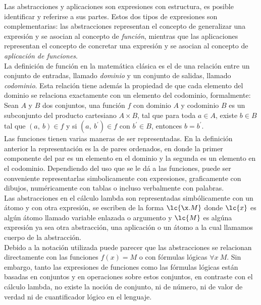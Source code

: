 Las abstracciones y aplicaciones son expresiones con estructura, es posible
identificar y referirse a sus partes. Estos dos tipos de expresiones son
complementarias: las abstracciones representan el concepto de generalizar una
expresión y se asocian al concepto de \emph{función}, mientras que las aplicaciones
representan el concepto de concretar una expresión y se asocian al concepto de
\emph{aplicación de funciones}. \\

La definición de función en la matemática clásica es el de una relación entre un
conjunto de entradas, llamado \emph{dominio} y un conjunto de salidas, llamado
\emph{codominio}. Esta relación tiene además la propiedad de que cada elemento
del dominio se relaciona exactamente con un elemento del codominio,
formalmente: \\

Sean \(A\) y \(B\) dos conjuntos, una función \(f\) con dominio \(A\) y
codominio \(B\) es un subconjunto del producto cartesiano \(A\times B\), tal que
para toda \(a\in A\), existe \(b\in B\) tal que \((a,\ b)\in f\) y si \((a,\
b^\prime)\in f\) con \(b^\prime \in B\), entonces \(b=b^\prime\). \\

Las funciones tienen varias maneras de ser representadas. En la definición
anterior la representación es la de pares ordenados, en donde la primer
componente del par es un elemento en el dominio y la segunda es un elemento en
el codominio. Dependiendo del uso que se le dá a las funciones,
puede ser conveniente representarlas simbolicamente con expresiones,
graficamente con dibujos, numéricamente con tablas o incluso verbalmente con
palabras. \\

Las abstracciones en el cálculo lambda son representadas simbólicamente con un
átomo y con otra expresión, se escriben de la forma \(\lc{\x.M}\) donde
\(\lc{x}\) es algún átomo llamado variable enlazada o argumento y \(\lc{M}\)
es algúna expresión ya sea otra abstracción, una aplicación o un átomo a la cual
llamamos cuerpo de la abstracción. \\

Debido a la notación utilizada puede parecer que las abstracciones se relacionan
directamente con las funciones \(f(x)=M\) o con fórmulas lógicas \(\forall x\
M\). Sin embargo, tanto las expresiones de funciones como las fórmulas lógicas
están basadas en conjuntos y en operaciones sobre estos conjuntos, en contraste
con el cálculo lambda, no existe la noción de conjunto, ni de número, ni de
valor de verdad ni de cuantificador lógico en el lenguaje. \\

